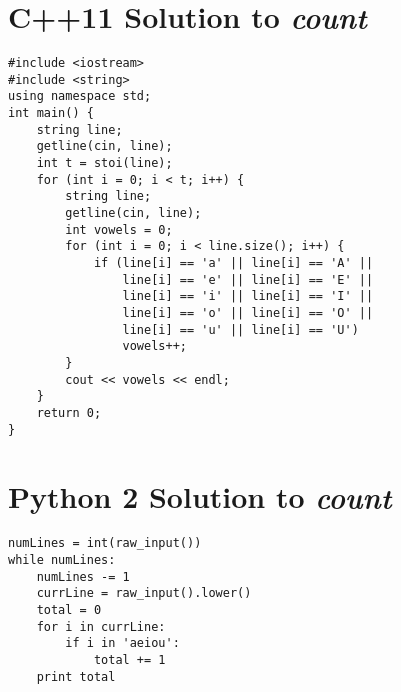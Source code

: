 \documentclass[a4paper,11pt]{article}
\begin{document}
\section*{C++11 Solution to \emph{count}}

\begin{lstlisting}
#include <iostream>
#include <string>
using namespace std;
int main() {
	string line;
	getline(cin, line);
	int t = stoi(line);
	for (int i = 0; i < t; i++) {
		string line;
		getline(cin, line);
		int vowels = 0;
		for (int i = 0; i < line.size(); i++) {
			if (line[i] == 'a' || line[i] == 'A' || 
				line[i] == 'e' || line[i] == 'E' ||
				line[i] == 'i' || line[i] == 'I' ||
				line[i] == 'o' || line[i] == 'O' ||
				line[i] == 'u' || line[i] == 'U')
				vowels++;
		}
		cout << vowels << endl;
	}
	return 0;
}
\end{lstlisting}
\section*{Python 2 Solution to \emph{count}}
\begin{lstlisting}
numLines = int(raw_input())
while numLines:
	numLines -= 1
	currLine = raw_input().lower()
	total = 0
	for i in currLine:
		if i in 'aeiou':
			total += 1
	print total
\end{lstlisting}
\end{document}
